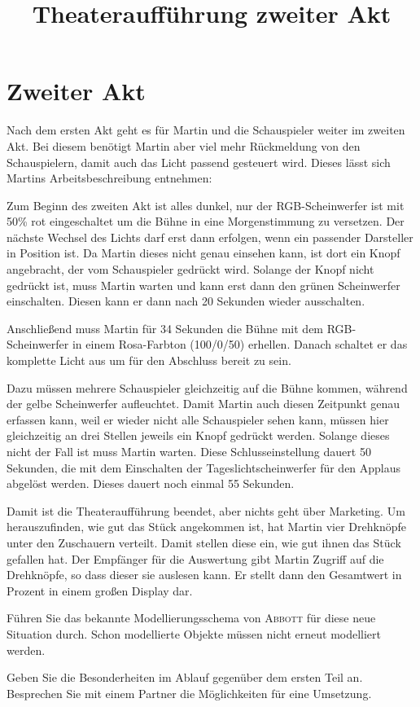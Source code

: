 \documentclass[11pt, a4paper]{scrartcl}
\title{Theateraufführung zweiter Akt}
\begin{document}
\section*{Zweiter Akt}

Nach dem ersten Akt geht es für Martin und die Schauspieler weiter im zweiten Akt. Bei diesem benötigt Martin aber viel mehr Rückmeldung von den Schauspielern, damit auch das Licht passend gesteuert wird. Dieses lässt sich Martins Arbeitsbeschreibung entnehmen:

\begin{mdframed}
    Zum Beginn des zweiten Akt ist alles dunkel, nur der RGB-Scheinwerfer ist mit 50\% rot eingeschaltet um die Bühne in eine Morgenstimmung zu versetzen. Der nächste Wechsel des Lichts darf erst dann erfolgen, wenn ein passender Darsteller in Position ist. Da Martin dieses nicht genau einsehen kann, ist dort ein Knopf angebracht, der vom Schauspieler gedrückt wird. Solange der Knopf nicht gedrückt ist, muss Martin warten und kann erst dann den grünen Scheinwerfer einschalten. Diesen kann er dann nach 20 Sekunden wieder ausschalten.

    Anschließend muss Martin für 34 Sekunden die Bühne mit dem RGB-Scheinwerfer in einem Rosa-Farbton (100/0/50) erhellen. Danach schaltet er das komplette Licht aus um für den Abschluss bereit zu sein.

    Dazu müssen mehrere Schauspieler gleichzeitig auf die Bühne kommen, während der gelbe Scheinwerfer aufleuchtet. Damit Martin auch diesen Zeitpunkt genau erfassen kann, weil er wieder nicht alle Schauspieler sehen kann, müssen hier gleichzeitig an drei Stellen jeweils ein Knopf gedrückt werden. Solange dieses nicht der Fall ist muss Martin warten. Diese Schlusseinstellung dauert 50 Sekunden, die mit dem Einschalten der Tageslichtscheinwerfer für den Applaus abgelöst werden. Dieses dauert noch einmal 55 Sekunden.

    Damit ist die Theateraufführung beendet, aber nichts geht über Marketing. Um herauszufinden, wie gut das Stück angekommen ist, hat Martin vier Drehknöpfe unter den Zuschauern verteilt. Damit stellen diese ein, wie gut ihnen das Stück gefallen hat. Der Empfänger für die Auswertung gibt Martin Zugriff auf die Drehknöpfe, so dass dieser sie auslesen kann. Er stellt dann den Gesamtwert in Prozent in einem großen Display dar.
\end{mdframed}

\begin{aufgabe}
    Führen Sie das bekannte Modellierungsschema von \textsc{Abbott} für diese neue Situation durch. Schon modellierte Objekte müssen nicht erneut modelliert werden.
\end{aufgabe}

\begin{aufgabe}
    Geben Sie die Besonderheiten im Ablauf gegenüber dem ersten Teil an. Besprechen Sie mit einem Partner die Möglichkeiten für eine Umsetzung.
\end{aufgabe}
\end{document}
